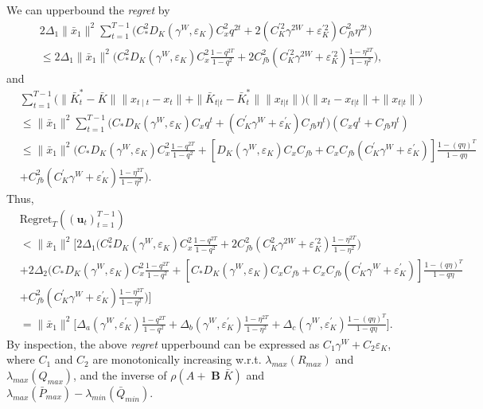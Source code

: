 \documentclass[letterpaper, 10 pt, conference]{ieeeconf}  %
\DeclareMathOperator{\contB}{\mathbf{B}}
\begin{document}
We can upperbound the \emph{regret} by
\begin{align*}
    &2\Delta_{1}\|\bar{x}_{1}\|^{2}\sum_{t=1}^{T-1}\bigg(C_{*}^{2}D_{K}(\gamma^{W},\varepsilon_{K})C_{x}^{2}q^{2t} + 2(C_{K}^{'2}\gamma^{2W}+\varepsilon_{K}^{'2})C_{fb}^{2}\eta^{2t}\bigg) \\
    &\leq 2\Delta_{1}\|\bar{x}_{1}\|^{2}\bigg(C_{*}^{2}D_{K}(\gamma^{W},\varepsilon_{K})C_{x}^{2}\frac{1-q^{2T}}{1-q^{2}} + 2C_{fb}^{2}(C_{K}^{'2}\gamma^{2W}+\varepsilon_{K}^{'2})\frac{1-\eta^{2T}}{1-\eta^{2}} \bigg),
\end{align*}
and
\begin{align*}
    &\sum_{t=1}^{T-1}\bigg( \|\bar{K}_{t}^{*}-\bar{K}\|\|x_{t\mid t}-x_{t}\|  + \|\bar{K}_{t|t}-\bar{K}_{t}^{*}\| \|x_{t|t}\|\bigg)\bigg(\|x_{t}-x_{t|t}\| + \|x_{t|t}\|\bigg)\\
    &\leq \|\bar{x}_{1}\|^{2}\sum_{t=1}^{T-1}\bigg(C_{*}D_{K}(\gamma^{W},\varepsilon_{K})C_{x}q^{t}+(C_{K}^{'}\gamma^{W}+\varepsilon_{K}^{'})C_{fb}\eta^{t}\bigg)(C_{x}q^{t}+C_{fb}\eta^{t})\\
    &\leq \|\bar{x}_{1}\|^{2}\bigg(C_{*}D_{K}(\gamma^{W},\varepsilon_{K})C_{x}^{2}\frac{1-q^{2T}}{1-q^{2}}+[D_{K}(\gamma^{W},\varepsilon_{K})C_{x}C_{fb}+C_{x}C_{fb}(C_{K}^{'}\gamma^{W}+\varepsilon_{K}^{'})]\frac{1-(q\eta)^{T}}{1-q\eta}\\
    &+ C_{fb}^{2}(C_{K}^{'}\gamma^{W}+\varepsilon_{K}^{'})\frac{1-\eta^{2T}}{1-\eta^{2}} \bigg).
\end{align*}
Thus,
\begin{align*}
    &\text{Regret}_{T}((\mathbf{u}_{t})_{t=1}^{T-1})\\
    &< \|\bar{x}_{1}\|^{2}\bigg[ 2\Delta_{1}\bigg(C_{*}^{2}D_{K}(\gamma^{W},\varepsilon_{K})C_{x}^{2}\frac{1-q^{2T}}{1-q^{2}} + 2C_{fb}^{2}(C_{K}^{2}\gamma^{2W}+\varepsilon_{K}^{'2})\frac{1-\eta^{2T}}{1-\eta^{2}} \bigg)\\
    &+2\Delta_{2}\bigg(C_{*}D_{K}(\gamma^{W},\varepsilon_{K})C_{x}^{2}\frac{1-q^{2T}}{1-q^{2}}+[C_{*}D_{K}(\gamma^{W},\varepsilon_{K})C_{x}C_{fb}+C_{x}C_{fb}(C_{K}^{'}\gamma^{W}+\varepsilon_{K}^{'})]\frac{1-(q\eta)^{T}}{1-q\eta}\\
    &+ C_{fb}^{2}(C_{K}^{'}\gamma^{W}+\varepsilon_{K}^{'})\frac{1-\eta^{2T}}{1-\eta^{2}} \bigg)\bigg]\\
    &= \|\bar{x}_{1}\|^{2}\bigg[\Delta_{a}(\gamma^{W},\varepsilon_{K}^{'})\frac{1-q^{2T}}{1-q^{2}} +  \Delta_{b}(\gamma^{W},\varepsilon_{K}^{'})\frac{1-\eta^{2T}}{1-\eta^{2}}+ \Delta_{c}(\gamma^{W},\varepsilon_{K}^{'})\frac{1-(q\eta)^{T}}{1-q\eta}\bigg].
\end{align*}
By inspection, the above \emph{regret} upperbound can be expressed as $C_{1}\gamma^{W}+C_{2}\varepsilon_{K}$, where $C_{1}$ and $C_{2}$ are monotonically increasing w.r.t. $\lambda_{max}(R_{max})$ and $\lambda_{max}(Q_{max})$, and the inverse of $\rho(A+\contB\bar{K})$ and $\lambda_{max}(\bar{P}_{max})-\lambda_{min}(\bar{Q}_{min})$.
\end{document}
